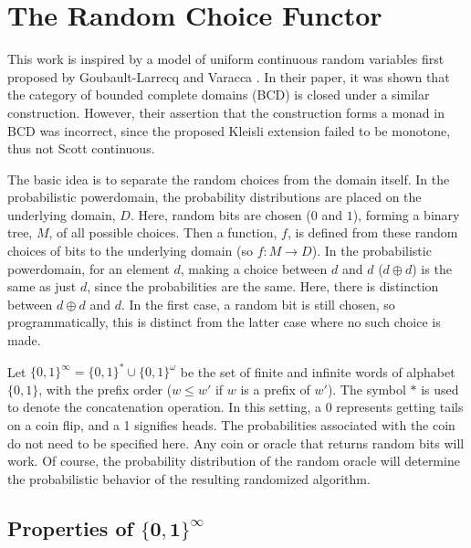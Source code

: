 


\section{The Random Choice Functor}

This work is inspired by a model of uniform continuous random variables first proposed by Goubault-Larrecq and Varacca \cite{GLV-lics2011}.  In their paper, it was shown that the category of bounded complete domains (\textsf{BCD}) is closed under a similar construction.  However, their assertion that the construction forms a monad in \textsf{BCD} was incorrect, since the proposed Kleisli extension failed to be monotone, thus not Scott continuous. 

The basic idea is to separate the random choices from the domain itself.  In the probabilistic powerdomain, the probability distributions are placed on the underlying domain, $D$.  Here, random bits are chosen ($0$ and $1$), forming a binary tree, $M$, of all possible choices. Then a function, $f$, is defined from these random choices of bits to the underlying domain (so $f:M\to D$).  In the probabilistic powerdomain, for an element $d$, making a choice between $d$ and $d$ ($d\oplus d$) is the same as just $d$, since the probabilities are the same.  Here, there is distinction between $d\oplus d$ and $d$.  In the first case, a random bit is still chosen, so programmatically, 
this is distinct from the latter case where no such choice is made.

Let $\{0,1\}^\infty = \{0,1\}^{*} \cup \{0,1\}^\omega$ be the set of finite and infinite words of alphabet $\{0,1\}$, with the prefix order ($w\leq w'$ if $w$ is a prefix of $w'$).  The symbol $*$ is used to denote the concatenation operation.  In this setting, a 0 represents getting tails on a coin flip, and a 1 signifies heads.  The probabilities associated with the coin do not need to be specified here.  Any coin or oracle that returns random bits will work.  Of course, the probability distribution of the random oracle will determine the probabilistic behavior of the resulting randomized algorithm.

\subsection[Properties of $\{0,1\}^\infty$]{Properties of $\boldsymbol{\{0,1\}^\infty}$}

